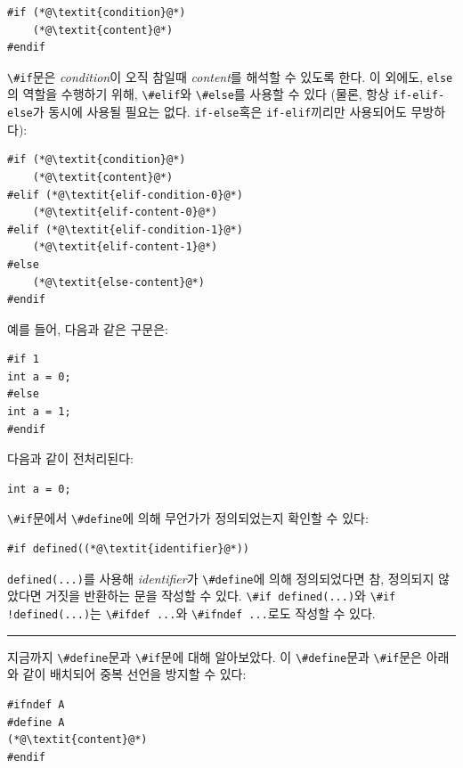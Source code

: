 \documentclass[a4paper,12pt]{book}
\newcommand{\V}[1]{\Verb|#1|}
\begin{document}
        \begin{lstlisting}
#if (*@\textit{condition}@*)
    (*@\textit{content}@*)
#endif
        \end{lstlisting}

        \V{\#if}문은 \textit{condition}이 오직 참일때 \textit{content}를 해석할 수 있도록 한다.
        이 외에도, \V{else}의 역할을 수행하기 위해, \V{\#elif}와 \V{\#else}를 사용할 수 있다
        (물론, 항상 \V{if-elif-else}가 동시에 사용될 필요는 없다.
        \V{if-else}혹은 \V{if-elif}끼리만 사용되어도 무방하다):

        \begin{lstlisting}
#if (*@\textit{condition}@*)
    (*@\textit{content}@*)
#elif (*@\textit{elif-condition-0}@*)
    (*@\textit{elif-content-0}@*)
#elif (*@\textit{elif-condition-1}@*)
    (*@\textit{elif-content-1}@*)
#else
    (*@\textit{else-content}@*)
#endif
        \end{lstlisting}

        예를 들어, 다음과 같은 구문은:

        \begin{lstlisting}
#if 1
int a = 0;
#else
int a = 1;
#endif
        \end{lstlisting}

        다음과 같이 전처리된다:

        \begin{lstlisting}
int a = 0;
        \end{lstlisting}

        \V{\#if}문에서 \V{\#define}에 의해 무언가가 정의되었는지 확인할 수 있다:

        \begin{lstlisting}
#if defined((*@\textit{identifier}@*))
        \end{lstlisting}

        \V{defined(...)}를 사용해 \textit{identifier}가 \V{\#define}에 의해 정의되었다면
        참, 정의되지 않았다면 거짓을 반환하는 문을 작성할 수 있다.
        \V{\#if defined(...)}와 \V{\#if !defined(...)}는
        \V{\#ifdef ...}와 \V{\#ifndef ...}로도 작성할 수 있다.

    \noindent\textcolor[RGB]{220,220,220}{
        \rule{\textwidth}{0.4pt}
    }

    
    지금까지 \V{\#define}문과 \V{\#if}문에 대해 알아보았다.
    이 \V{\#define}문과 \V{\#if}문은 아래와 같이 배치되어 중복 선언을 방지할 수 있다:

    \begin{lstlisting}
#ifndef A
#define A
(*@\textit{content}@*)
#endif
    \end{lstlisting}
\end{document}
